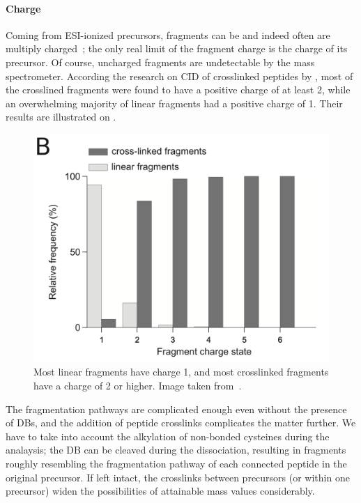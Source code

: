 \paragraph{Charge} Coming from ESI-ionized precursors, fragments can be and indeed often are multiply charged~\cite{katta1991use, michalski2012systematic}; the only real limit of the fragment charge is the charge of its precursor. Of course, uncharged fragments are undetectable by the mass spectrometer. According the research on CID of crosslinked peptides by \citet{giese2016study}, most of the crosslined fragments were found to have a positive charge of at least 2, while an overwhelming majority of linear fragments had a positive charge of 1. Their results are illustrated on .

\begin{figure}
  \centering
  \includegraphics[width=.5\linewidth]{img/crosslink-charge.png}
  \caption{Most linear fragments have charge 1, and most crosslinked fragments have a charge of 2 or higher. Image taken from~\citet{giese2016study}.}\label{fig:crosslink-charge}
\end{figure}

The fragmentation pathways are complicated enough even without the presence of DBs, and the addition of peptide crosslinks complicates the matter further. We have to take into account the alkylation of non-bonded cysteines during the analaysis; the DB can be cleaved during the dissociation, resulting in fragments roughly resembling the fragmentation pathway of each connected peptide in the original precursor. If left intact, the crosslinks between precursors (or within one precursor) widen the possibilities of attainable mass values considerably.

